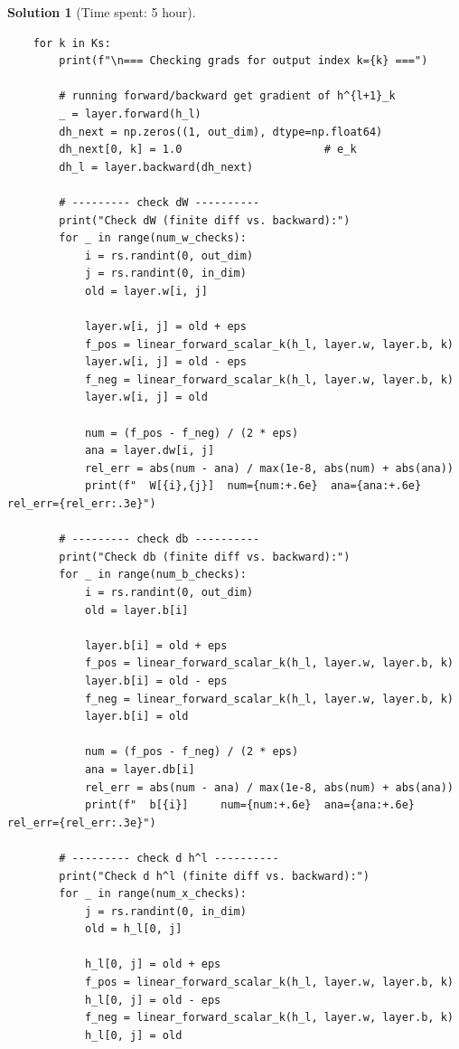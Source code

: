 \documentclass[11pt, reqno, letterpaper, twoside]{amsart}
\theoremstyle{plain}
\theoremstyle{definition}
\newtheorem{solution}[theorem]{Solution}
\begin{document}
\begin{solution}[Time spent: 5 hour]
\begin{lstlisting}
    for k in Ks:
        print(f"\n=== Checking grads for output index k={k} ===")

        # running forward/backward get gradient of h^{l+1}_k
        _ = layer.forward(h_l)                   
        dh_next = np.zeros((1, out_dim), dtype=np.float64)
        dh_next[0, k] = 1.0                      # e_k
        dh_l = layer.backward(dh_next)           

        # --------- check dW ----------
        print("Check dW (finite diff vs. backward):")
        for _ in range(num_w_checks):
            i = rs.randint(0, out_dim)          
            j = rs.randint(0, in_dim)            
            old = layer.w[i, j]

            layer.w[i, j] = old + eps
            f_pos = linear_forward_scalar_k(h_l, layer.w, layer.b, k)
            layer.w[i, j] = old - eps
            f_neg = linear_forward_scalar_k(h_l, layer.w, layer.b, k)
            layer.w[i, j] = old

            num = (f_pos - f_neg) / (2 * eps)    
            ana = layer.dw[i, j]                 
            rel_err = abs(num - ana) / max(1e-8, abs(num) + abs(ana))
            print(f"  W[{i},{j}]  num={num:+.6e}  ana={ana:+.6e}  rel_err={rel_err:.3e}")

        # --------- check db ----------
        print("Check db (finite diff vs. backward):")
        for _ in range(num_b_checks):
            i = rs.randint(0, out_dim)
            old = layer.b[i]

            layer.b[i] = old + eps
            f_pos = linear_forward_scalar_k(h_l, layer.w, layer.b, k)
            layer.b[i] = old - eps
            f_neg = linear_forward_scalar_k(h_l, layer.w, layer.b, k)
            layer.b[i] = old

            num = (f_pos - f_neg) / (2 * eps)
            ana = layer.db[i]
            rel_err = abs(num - ana) / max(1e-8, abs(num) + abs(ana))
            print(f"  b[{i}]     num={num:+.6e}  ana={ana:+.6e}  rel_err={rel_err:.3e}")

        # --------- check d h^l ----------
        print("Check d h^l (finite diff vs. backward):")
        for _ in range(num_x_checks):
            j = rs.randint(0, in_dim)
            old = h_l[0, j]

            h_l[0, j] = old + eps
            f_pos = linear_forward_scalar_k(h_l, layer.w, layer.b, k)
            h_l[0, j] = old - eps
            f_neg = linear_forward_scalar_k(h_l, layer.w, layer.b, k)
            h_l[0, j] = old


\end{lstlisting}
\end{solution}
\end{document}
